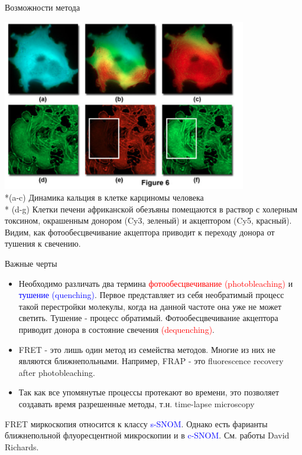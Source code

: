 \documentclass[9pt, compress, xcolor=table]{beamer}
\begin{document}
\begin{frame}{Возможности метода}

\begin{center}
\includegraphics[width=0.8\textwidth]{fret_images}
\\*(a-c) \small{Динамика кальция в клетке карциномы человека}
\\* (d-g) \small{Клетки печени африканской обезъяны помещаются в раствор с холерным токсином, окрашенным донором (Cy3, зеленый) и акцептором (Cy5, красный). Видим, как фотообесцвечивание акцептора приводит к переходу донора от тушения к свечению.}
\end{center}
\end{frame}

\begin{frame}{Важные черты}
\begin{itemize}
\item Необходимо различать два термина \textcolor{red}{фотообесцвечивание (photobleaching)} и \textcolor{blue}{тушение (quenching)}. Первое представляет из себя необратимый процесс такой перестройки молекулы, когда на данной частоте она уже не может светить. Тушение -  процесс обратимый. Фотообесцвечивание акцептора приводит донора в состояние свечения \textcolor{red}{(dequenching)}.
\item FRET - это лишь один метод из семейства методов. Многие из них не являются ближнепольными. Например, FRAP - это fluorescence recovery after photobleaching.
\item Так как все упомянутые процессы протекают во времени, это позволяет создавать время разрешенные методы, т.н. time-lapse microscopy
\end{itemize}

FRET миркоскопия относится к классу \textcolor{blue}{s-SNOM}. Однако есть фарианты ближнепольной флуоресцентной микроскопии и в \textcolor{blue}{c-SNOM}. См. работы David Richards.

\end{frame}
\end{document}
